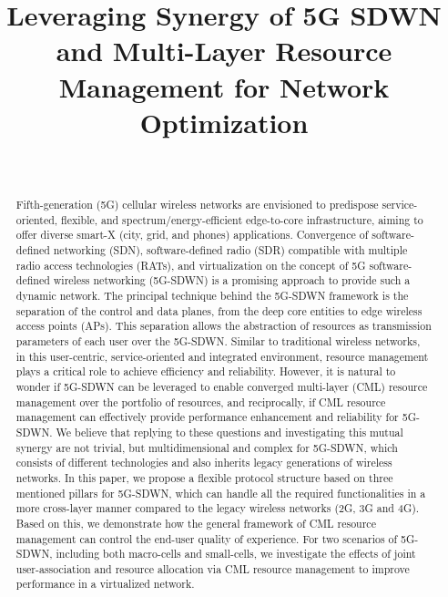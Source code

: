 \documentclass[conference]{IEEEtran}
\begin{document}
\thispagestyle{empty}
\title{Leveraging Synergy of 5G SDWN and Multi-Layer Resource Management for Network Optimization}

\author{
     \\
    }
\maketitle



\begin{abstract} 
Fifth-generation (5G) cellular wireless networks are envisioned to predispose service-oriented, flexible, and spectrum/energy-efficient edge-to-core infrastructure, aiming to offer diverse smart-X (city, grid, and phones) applications. Convergence of software-defined networking (SDN), software-defined radio (SDR) compatible with multiple radio access technologies (RATs), and virtualization on the concept of 5G software-defined wireless networking (5G-SDWN) is a promising approach to provide such a dynamic network. The principal technique behind the 5G-SDWN framework is the separation of the control and data planes, from the deep core entities to edge wireless access points (APs). This separation allows the abstraction of resources as transmission parameters of each user over the 5G-SDWN. Similar to traditional wireless networks, in this user-centric, service-oriented and integrated environment, resource management plays a critical role to achieve efficiency and reliability. However, it is natural to wonder if 5G-SDWN can be leveraged to enable converged multi-layer (CML) resource management over the portfolio of resources, and reciprocally, if CML resource management can effectively provide performance enhancement and reliability for 5G-SDWN. We believe that replying to these questions and investigating this mutual synergy are not trivial, but multidimensional and complex for 5G-SDWN, which consists of different technologies and also inherits legacy generations of wireless networks. In this paper, we propose a flexible protocol structure based on three mentioned pillars for 5G-SDWN, which can handle all the required functionalities in a more cross-layer manner compared to the legacy wireless networks (2G, 3G and 4G). Based on this, we demonstrate how the general framework of CML resource management can control the end-user quality of experience. For two scenarios of 5G-SDWN, including both macro-cells and small-cells, we investigate the effects of joint user-association and resource allocation via CML resource management to improve performance in a virtualized network. 

\end{abstract}
\end{document}
